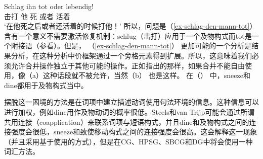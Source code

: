 \ea
\gll Schlag ihn tot oder lebendig!\\
     击打   他 死 或者 活着\\
\glt `在他死之后或者还活着的时候打他！'
\z
所以，问题是（\ref{ex-schlag-den-mann-tot}） 含有一个意义不需要激活修复机制：schlug（击打）应用于一个及物构式而tot是一个附接语（参看\citealp{Winkler97a}）。但是， （\ref{ex-schlag-den-mann-tot}） 更加可能的一个分析是结果分析，在这种分析中价框架通过一个旁格元素得到扩展。所以，这意味着我们必须允许合并操作独立于其他可能的操作。正如\citet[]{SvT2011a}指出的那样，如果合并不能自由使用，像（a）这种话段就不被允许，当然（b） 也是这样。
\eal
{}
\zl
在（） 中，sneeze和dine都用于及物构式当中。

摆脱这一困境的方法是在词项中建立描述动词使用句法环境的信息。这种信息可以进行加权，例如dine用作及物动词的概率很低。Steels和van Trijp可能会通过所谓共用连接（coapplication）来联系词项与短语构式，并且dine和及物构式之间的连接强度会很低，sneeze和致使移动构式之间的连接强度会很高。这会解释这一现象（并且采用基于使用的方式），但是在CG、HPSG、SBCG和DG中将会使用一种词汇方法。

